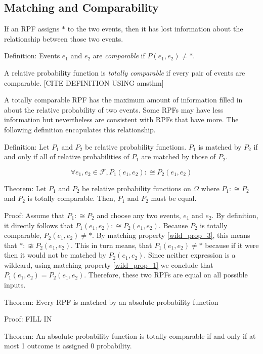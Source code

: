 \documentclass[twoside]{article}
\theoremstyle{plain}%
\theoremstyle{definition}
\theoremstyle{remark}
\begin{document}
\subsection{Matching and Comparability}

If an RPF assigns \(\ast\) to the two events, then it has lost information about the relationship between those two events.

Definition: Events \(e_1\) and \(e_2\) are \textit{comparable} if \(P(e_1, e_2) \neq \ast\).

A relative probability function is \textit{totally comparable} if every pair of events are comparable. [CITE DEFINITION USING amsthm]

A totally comparable RPF has the maximum amount of information filled in about the relative probability of two events. Some RPFs may have less information but nevertheless are consistent with RPFs that have more. The following definition encapulates this relationship.

Definition: Let \(P_1\) and \(P_2\) be relative probability functions. \(P_1\) is matched by \(P_2\) if and only if all of relative probabilities of \(P_1\) are matched by those of \(P_2\).

\begin{equation}
\forall e_1, e_2 \in \mathcal{F}, P_1(e_1, e_2) :\cong P_2(e_1, e_2)
\end{equation}

Theorem: Let \(P_1\) and \(P_2\) be relative probability functions on \(\Omega\) where \(P_1 :\cong P_2\) and \(P_2\) is totally comparable. Then, \(P_1\) and \(P_2\) must be equal.

Proof: Assume that \(P_1 :\cong P_2\) and choose any two events, \(e_1\) and \(e_2\). By definition, it directly follows that \(P_1(e_1, e_2) :\cong P_2(e_1, e_2)\). Because \(P_2\) is totally comparable, \(P_2(e_1, e_2) \neq \ast\). By matching property \ref{wild_prop_3}, this means that \(\ast :\ncong P_2(e_1, e_2)\). This in turn means, that \(P_1(e_1, e_2) \neq \ast\) because if it were then it would not be matched by \(P_2(e_1, e_2)\). Since neither expression is a wildcard, using matching property \ref{wild_prop_1} we conclude that \(P_1(e_1, e_2) = P_2(e_1, e_2)\). Therefore, these two RPFs are equal on all possible inputs.

Theorem: Every RPF is matched by an absolute probability function

Proof: FILL IN

Theorem: An absolute probability function is totally comparable if and only if at most 1 outcome is assigned 0 probability.
\end{document}

